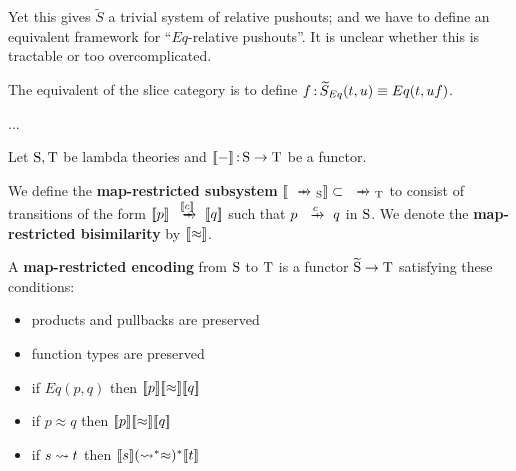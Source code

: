 \documentclass{article}
\begin{document}
Yet this gives $\widetilde{S}$ a trivial system of relative pushouts; and we have to define an equivalent framework for ``$Eq$-relative pushouts''. It is unclear whether this is tractable or too overcomplicated.

The equivalent of the slice category is to define $f\,{:}\, \widetilde{S}_{Eq}(t,u) \equiv Eq(t,uf)$. 

...

\begin{definition}
    Let $\mathrm{S}, \mathrm{T}$ be lambda theories and $[\![-]\!]\,{:}\, \mathrm{S}\to \mathrm{T}$ be a functor. 
    
    We define the \textbf{map-restricted subsystem} $\map{\xr{}_\mrm{S}} \subset\; \xr{}_\T$ to consist of transitions of the form $\map{p}\xr{\map{c}} \map{q}$ such that $p\xr{c} q$ in $\mathrm{S}$. We denote the \textbf{map-restricted bisimilarity} by $[\![\approx]\!]$.
    
    A \textbf{map-restricted encoding} from $\mathrm{S}$ to $\mathrm{T}$ is a functor $\widetilde{\mathrm{S}}\to \mathrm{T}$ satisfying these conditions:
    \begin{itemize}
        \item products and pullbacks are preserved
        \item function types are preserved
        \item if $Eq(p,q)$ then $[\![p]\!] [\![\approx]\!] [\![q]\!]$
        \item if $p\approx q$ then $[\![p]\!][\![\approx]\!] [\![q]\!]$
        \item if $s\rightsquigarrow t$ then $[\![s]\!](\rightsquigarrow^\ast\approx)^\ast [\![t]\!]$
    \end{itemize}
\end{definition}
\end{document}
